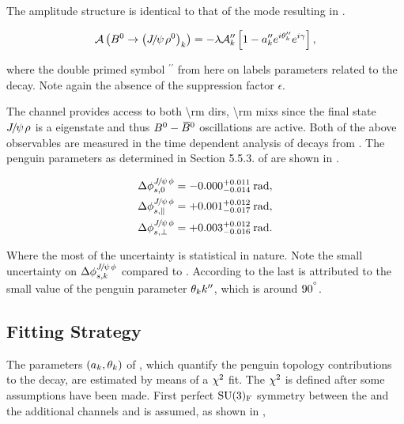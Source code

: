 \noindent The amplitude structure is identical to that of the \BsJpsiKst mode resulting in .

\begin{equation}
  \mathcal{A} \left( B^0\rightarrow \left({J\mskip -3mu/\mskip -2mu\psi\mskip 2mu} \rho^0\right)_{k} \right) = -\lambda \mathcal{A}_{k}'' \left[  1 - a_k'' e^{i\theta_k''} e^{i\gamma}  \right],
  \label{bsjpsirho_amp}
\end{equation}

\noindent where the double primed symbol ${}^{\prime\prime}$ from here on labels parameters related to the \BdJpsiRho decay.
Note again the absence of the suppression factor $\epsilon$.

The \BdJpsiRho channel provides access to both \Acp{\rm dir}, \Acp{\rm mix} since the final state ${J\mskip -3mu/\mskip -2mu\psi\mskip 2mu}\rho$ is
a \CP eigenstate and thus $B^0-\kern 0.18em\overline{\kern -0.18em B}{}^0$ oscillations are active. Both of the above observables are measured in the
time dependent analysis of \BdJpsipipi decays from \lhcb \cite{Aaij:2014vda}. The penguin parameters as determined
in Section 5.5.3. of \cite{DeBruyn-thesis} are shown in .

\begin{subequations}
  \label{delta_phis_jpsirho}
  \begin{align}
    \Delta\phi^{{J\mskip -3mu/\mskip -2mu\psi\mskip 2mu}\phi}_{s,{0}}         & = -0.000^{+0.011}_{-0.014}\:\text{rad},\\
    \Delta\phi^{{J\mskip -3mu/\mskip -2mu\psi\mskip 2mu}\phi}_{s,{\parallel}} & = +0.001^{+0.012}_{-0.017}\:\text{rad},\\
    \Delta\phi^{{J\mskip -3mu/\mskip -2mu\psi\mskip 2mu}\phi}_{s,{\perp}}     & = +0.003^{+0.012}_{-0.016}\:\text{rad}.
  \end{align}
\end{subequations}

\noindent Where the most of the uncertainty is statistical in nature. Note the small uncertainty on
$\Delta\phi^{{J\mskip -3mu/\mskip -2mu\psi\mskip 2mu}\phi}_{s,{k}}$ compared to . According to \cite{DeBruyn-thesis} the last is attributed
to the small value of the penguin parameter $\theta_k{k}''$, which is around $90^{^{\circ}}$.

\subsection{Fitting Strategy}
\label{penguin_chi2_fit}

The parameters $(a_k,\theta_k)$ of , which quantify the penguin topology contributions
to the \BsJpsiPhi decay, are estimated by means of a $\chi^2$ fit. The $\chi^2$ is defined after some assumptions have
been made. First perfect $\mathrm{SU}(3)_{\rm F}$ symmetry between the \BsJpsiPhi and the additional channels \BsJpsiKst
and \BdJpsiRho is assumed, as shown in ,

